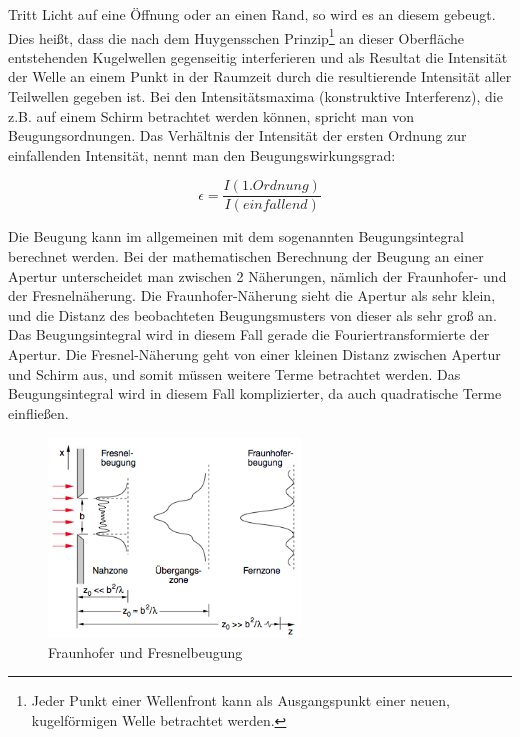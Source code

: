 Tritt Licht auf eine Öffnung oder an einen Rand, so wird es an diesem gebeugt. Dies heißt, dass die nach dem Huygensschen Prinzip\footnote{Jeder Punkt einer Wellenfront kann als Ausgangspunkt einer neuen, kugelförmigen Welle betrachtet werden.} an dieser Oberfläche entstehenden Kugelwellen gegenseitig interferieren und als Resultat die Intensität der Welle an einem Punkt in der Raumzeit durch die resultierende Intensität aller Teilwellen gegeben ist. Bei den Intensitätsmaxima (konstruktive Interferenz), die z.B. auf einem Schirm betrachtet werden können, spricht man von Beugungsordnungen. Das Verhältnis der Intensität der ersten Ordnung zur einfallenden Intensität, nennt man den Beugungswirkungsgrad:

\begin{equation} \epsilon = \frac{I (1.Ordnung)}{I(einfallend)} \end{equation}

Die Beugung kann im allgemeinen mit dem sogenannten Beugungsintegral berechnet werden. Bei der mathematischen Berechnung der Beugung an einer Apertur unterscheidet man zwischen 2 Näherungen, nämlich der Fraunhofer- und der Fresnelnäherung. Die Fraunhofer-Näherung sieht die Apertur als sehr klein, und die Distanz des beobachteten Beugungsmusters von dieser als sehr groß an. Das Beugungsintegral wird in diesem Fall gerade die Fouriertransformierte der Apertur. Die Fresnel-Näherung geht von einer kleinen Distanz zwischen Apertur und Schirm aus, und somit müssen weitere Terme betrachtet werden. Das Beugungsintegral wird in diesem Fall komplizierter, da auch quadratische Terme einfließen.


\begin{figure}[H]
\centering \includegraphics[width = 0.6\textwidth]{BilderTheo/FraunhoferFresnel.png}
\caption{Fraunhofer und Fresnelbeugung\protect\cite{Demtroeder2}}%
\end{figure}

